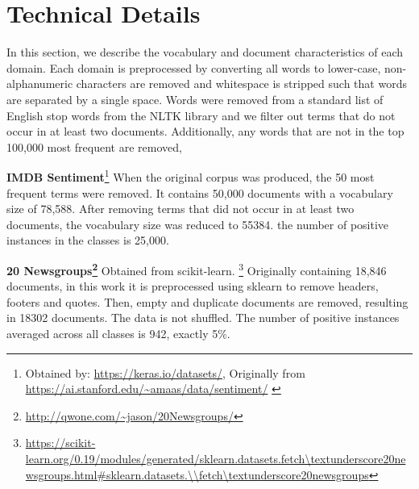 \section{Technical Details}\label{ch2.5:technical}

In this section, we describe the vocabulary and document characteristics of each domain. Each domain is preprocessed by converting all words to lower-case,  non-alphanumeric characters are removed and whitespace is stripped such that words are separated by a single space. Words were removed from a standard list of English stop words from the NLTK library \cite{Bird} and we filter out terms that do not occur in at least two documents. Additionally, any words that are not in the top 100,000 most frequent are removed, 



\textbf{IMDB Sentiment}\footnote{Obtained by: \url{https://keras.io/datasets/}, Originally from \url{https://ai.stanford.edu/~amaas/data/sentiment/} \cite{Maas2011a}} When the original corpus was produced, the 50 most frequent terms were removed. It contains 50,000 documents with a vocabulary size of 78,588. After removing terms that did not occur in at least two documents, the vocabulary size was reduced to 55384.  the number of positive instances in the classes is 25,000.


\textbf{20 Newsgroups\footnote{\url{http://qwone.com/~jason/20Newsgroups/}}} Obtained from scikit-learn. \footnote{\url{https://scikit-learn.org/0.19/modules/generated/sklearn.datasets.fetch\textunderscore20newsgroups.html\#sklearn.datasets.\\fetch\textunderscore20newsgroups}} Originally containing 18,846 documents, in this work it is preprocessed using sklearn to remove headers, footers and quotes. Then, empty and duplicate documents are removed, resulting in 18302 documents.  The data is not shuffled. The number of positive instances averaged across all classes is 942, exactly 5\%.

